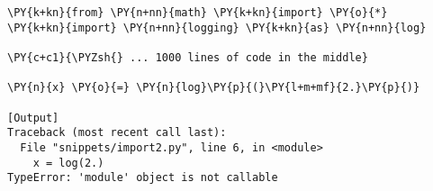 \begin{Verbatim}[label=\makebox{\url{https://github.com/lucabaldini/cmepda/tree/master/slides/latex/snippets/import2.py}},commandchars=\\\{\}]
\PY{k+kn}{from} \PY{n+nn}{math} \PY{k+kn}{import} \PY{o}{*}
\PY{k+kn}{import} \PY{n+nn}{logging} \PY{k+kn}{as} \PY{n+nn}{log}

\PY{c+c1}{\PYZsh{} ... 1000 lines of code in the middle}

\PY{n}{x} \PY{o}{=} \PY{n}{log}\PY{p}{(}\PY{l+m+mf}{2.}\PY{p}{)}

[Output]
Traceback (most recent call last):
  File "snippets/import2.py", line 6, in <module>
    x = log(2.)
TypeError: 'module' object is not callable
\end{Verbatim}